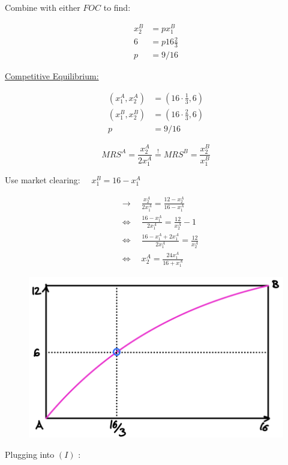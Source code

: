 {{\begin{enumerate}[label=(\roman*)]
{Combine with either $F O C$ to find:

$$
\begin{aligned}
x_{2}^{B} &= p x_{1}^{B} \\
6 &= p 16\frac{2}{3} \\
p &= 9 / 16
\end{aligned}
$$

\underline{Competitive Equilibrium:}

$$
\begin{aligned}
\left(x_{1}^{A}, x_{2}^{A}\right) & =(16 \cdot \frac{1}{3},6) \\
\left(x_{1}^{B}, x_{2}^{B}\right) & =(16 \cdot \frac{2}{3},6) \\
p & =9 / 16
\end{aligned}
$$
}
{\item 
$$
M R S^{A}=\frac{x_{2}^{A}}{2 x_{1}^{A}} \stackrel{!}{=} M R S^{B}=\frac{x_{2}^{B}}{x_{1}^{B}}
$$

Use market clearing: $\quad x_{1}^{B}=16-x_{1}^{A}$

\begin{align*}
& \longrightarrow \quad \frac{x_{2}^{A}}{2 x_{1}^{A}}=\frac{12-x_{2}^{A}}{16-x_{1}^{A}} \\
& \Leftrightarrow \quad \frac{16-x_{1}^{A}}{2 x_{1}^{A}}=\frac{12}{x_{2}^{A}}-1 \\
& \Leftrightarrow \quad \frac{16-x_{1}^{A}+2 x_{1}^{A}}{2 x_{1}^{A}}=\frac{12}{x_{2}^{A}} \\
& \Leftrightarrow \quad x_{2}^{A}=\frac{24 x_{1}^{A}}{16+x_{1}^{A}} \tag{I}
\end{align*}

\begin{figure}[!htp]
    \centering
    \includegraphics[width=.75\textwidth]{images/2018_19_1.png}
\end{figure}
}
{\item 
Plugging into $(I)$ :

}
\end{enumerate}}}
